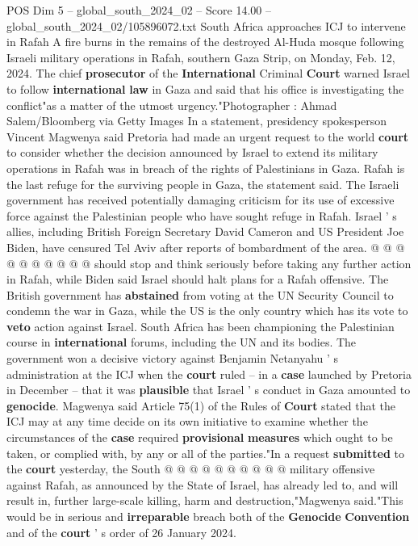 \begin{textsample}{POS Dim 5 – global\_south\_2024\_02 – Score 14.00 – global\_south\_2024\_02/105896072.txt}  \label{ex:f5_pos_158}
South Africa approaches ICJ to intervene in Rafah A fire burns in the remains of the destroyed Al-Huda mosque following Israeli military operations in Rafah, southern Gaza Strip, on Monday, Feb. 12, 2024.
The chief \textbf{prosecutor} of the \textbf{International} Criminal \textbf{Court} warned Israel to follow \textbf{international} \textbf{law} in Gaza and said that his office is investigating the conflict"as a matter of the utmost urgency."Photographer : Ahmad Salem/Bloomberg via Getty Images In a statement, presidency spokesperson Vincent Magwenya said Pretoria had made an urgent request to the world \textbf{court} to consider whether the decision announced by Israel to extend its military operations in Rafah was in breach of the rights of Palestinians in Gaza.
Rafah is the last refuge for the surviving people in Gaza, the statement said.
The Israeli government has received potentially damaging criticism for its use of excessive force against the Palestinian people who have sought refuge in Rafah.
Israel ' s allies, including British Foreign Secretary David Cameron and US President Joe Biden, have censured Tel Aviv after reports of bombardment of the area. @ @ @ @ @ @ @ @ @ @ should stop and think seriously before taking any further action in Rafah, while Biden said Israel should halt plans for a Rafah offensive.
The British government has \textbf{abstained} from voting at the UN Security Council to condemn the war in Gaza, while the US is the only country which has its vote to \textbf{veto} action against Israel.
South Africa has been championing the Palestinian course in \textbf{international} forums, including the UN and its bodies.
The government won a decisive victory against Benjamin Netanyahu ' s administration at the ICJ when the \textbf{court} ruled -- in a \textbf{case} launched by Pretoria in December -- that it was \textbf{plausible} that Israel ' s conduct in Gaza amounted to \textbf{genocide}.
Magwenya said Article 75(1) of the Rules of \textbf{Court} stated that the ICJ may at any time decide on its own initiative to examine whether the circumstances of the \textbf{case} required \textbf{provisional} \textbf{measures} which ought to be taken, or complied with, by any or all of the parties."In a request \textbf{submitted} to the \textbf{court} yesterday, the South @ @ @ @ @ @ @ @ @ @ military offensive against Rafah, as announced by the State of Israel, has already led to, and will result in, further large-scale killing, harm and destruction,"Magwenya said."This would be in serious and \textbf{irreparable} breach both of the \textbf{Genocide} \textbf{Convention} and of the \textbf{court} ' s order of 26 January 2024.

\end{textsample}
